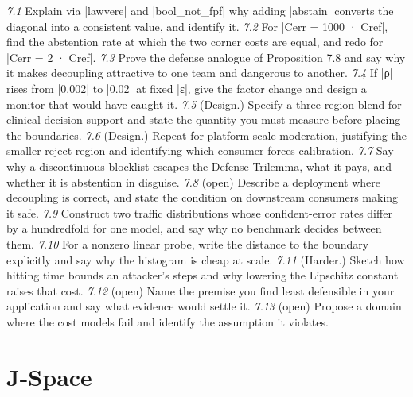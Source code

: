 \documentclass{memoir}
\begin{document}
\emph{7.1} Explain via \LeanVerb|lawvere| and \LeanVerb|bool_not_fpf| why adding \LeanVerb|abstain|
converts the diagonal into a consistent value, and identify it.
\emph{7.2} For \LeanVerb|Cerr = 1000 · Cref|, find the abstention rate at which the two corner costs
are equal, and redo for \LeanVerb|Cerr = 2 · Cref|.
\emph{7.3} Prove the defense analogue of Proposition 7.8 and say why it makes decoupling
attractive to one team and dangerous to another.
\emph{7.4} If \LeanVerb|ρ| rises from \LeanVerb|0.002| to \LeanVerb|0.02| at fixed \LeanVerb|ε|, give the factor change and
design a monitor that would have caught it.
\emph{7.5} (Design.) Specify a three-region blend for clinical decision support and state
the quantity you must measure before placing the boundaries.
\emph{7.6} (Design.) Repeat for platform-scale moderation, justifying the smaller reject
region and identifying which consumer forces calibration.
\emph{7.7} Say why a discontinuous blocklist escapes the Defense Trilemma, what it pays, and
whether it is abstention in disguise.
\emph{7.8} (open) Describe a deployment where decoupling is correct, and state the condition
on downstream consumers making it safe.
\emph{7.9} Construct two traffic distributions whose confident-error rates differ by a
hundredfold for one model, and say why no benchmark decides between them.
\emph{7.10} For a nonzero linear probe, write the distance to the boundary explicitly and
say why the histogram is cheap at scale.
\emph{7.11} (Harder.) Sketch how hitting time bounds an attacker's steps and why lowering
the Lipschitz constant raises that cost.
\emph{7.12} (open) Name the premise you find least defensible in your application and say
what evidence would settle it.
\emph{7.13} (open) Propose a domain where the cost models fail and identify the assumption
it violates.



\section{J-Space}\label{Two--Schemas--of--Impossibility-005F-005F-005F--Machine--Checked--Limits--of--Trustworthy--Machine--Learning-005F-005F-005F--and--Why--They--Tighten--with--Capability----Exercises----J--Space}
\end{document}
